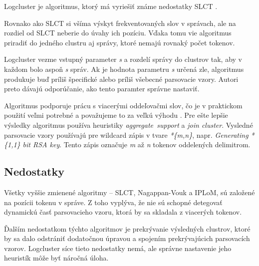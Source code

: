 Logcluster je algoritmus, ktorý má vyriešiť známe nedostatky SLCT \parencite{logcluster}. 
\par Rovnako ako SLCT si všíma výskyt frekventovaných slov v správach, ale na rozdiel od SLCT neberie do úvahy ich pozíciu. Vďaka tomu vie algoritmus priradiť do jedného clustru aj správy, ktoré nemajú rovnaký počet tokenov. 
\par Logcluster vezme vstupný parameter \emph{s} a rozdelí správy do clustrov tak, aby v každom bolo aspoň \emph{s} správ. Ak je hodnota parametru \emph{s} určená zle, algoritmus produkuje buď príliš špecifické alebo príliš všebecné parsovacie vzory. Autori preto dávajú odporúčanie, ako tento paramter správne nastaviť. 
\par Algoritmus podporuje prácu s viacerými oddeľovačmi slov, čo je v praktickom použití veľmi potrebné a považujeme to za veľkú výhodu \parencite{logclustertool}. Pre ešte lepšie výsledky algoritmus používa heuristiky \emph{aggregate\, support} a \emph{join cluster}. Vysledné parsovacie vzory používajú pre wildcard zápis v tvare \emph{*\{m,n\}}, napr. \emph{Generating *\{1,1\} bit RSA key}. Tento zápis označuje \emph{m} až \emph{n} tokenov oddelených delimitrom.


\subsection{Nedostatky}
Všetky vyššie zmienené algoritmy -- SLCT, Nagappan-Vouk a IPLoM, sú založené na pozícii tokenu v správe. Z toho vyplýva, že nie sú schopné detegovať dynamickú časť parsovacieho vzoru, ktorá by sa skladala z viacerých tokenov. 
\par Ďalším nedostatkom týchto algoritmov je prekrývanie výsledných clustrov, ktoré by sa dalo odstrániť dodatočnou úpravou a spojením prekrývajúcich parsovacích vzorov. Logcluster síce tieto nedostatky nemá, ale správne nastavenie jeho heuristík môže byť náročná úloha.